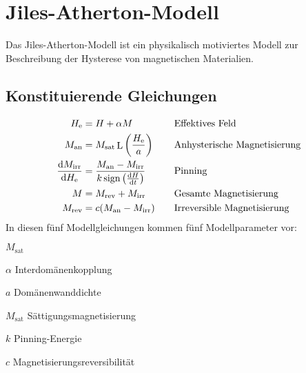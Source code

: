 \documentclass{scrartcl}
\DeclareMathOperator{\sign}{sign}
\DeclareMathOperator{\Langevin}{L}
\newcommand{\He}{H_\text{e}}
\newcommand{\Man}{M_\text{an}}
\newcommand{\Msat}{M_\text{sat}}
\newcommand{\Mirr}{M_\text{irr}}
\newcommand{\Mrev}{M_\text{rev}}
\begin{document}
\section{Jiles-Atherton-Modell}
\label{sec:jiles-atherton}
Das Jiles-Atherton-Modell ist ein physikalisch motiviertes Modell zur Beschreibung der Hysterese von magnetischen Materialien.
\subsection{Konstituierende Gleichungen}
\begin{align}
	\He &= H + \alpha M \quad &&\text{Effektives Feld} \label{eq:h_eff}\\
	\Man &= \Msat \Langevin\left(\frac{\He}{a}\right) \quad &&\text{Anhysterische Magnetisierung}  \label{eq:m_an}\\
	\frac{\dif\Mirr}{\dif \He} &= \frac{\Man - \Mirr}{k \sign\left(\frac{\dif H}{\dif t}\right)} \quad &&\text{Pinning} \label{eq:pinning}\\
	M &= \Mrev + \Mirr \quad &&\text{Gesamte Magnetisierung} \label{eq:m_gesamt}\\
	\Mrev &= c(\Man - \Mirr) \quad &&\text{Irreversible Magnetisierung} \label{eq:m_rev}
\end{align}
In diesen fünf Modellgleichungen kommen fünf Modellparameter vor:
\begin{labeling}{$\Msat$}
	\item[$\alpha$]{Interdomänenkopplung}
	\item[$a$]{Domänenwanddichte}
	\item[$\Msat$]{Sättigungsmagnetisierung}
	\item[$k$]{Pinning-Energie}
	\item[$c$]{Magnetisierungsreversibilität}
\end{labeling}
\end{document}
